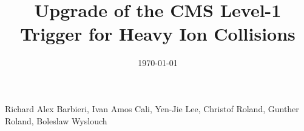 \begin{titlepage}
\vspace{-.2 cm} 
\date{\today}
\vspace{2 cm}
\title{Upgrade of the CMS Level-1 Trigger for Heavy Ion Collisions}

\vspace{.2 cm} 
\begin{Authlist}
Richard Alex Barbieri\footnotemark[1],
Ivan Amos Cali\footnotemark[1],
Yen-Jie Lee\footnotemark[1], 
Christof Roland\footnotemark[1], 
Gunther Roland\footnotemark[1], 
Boleslaw Wyslouch\footnotemark[1]
\end{Authlist}



\end{titlepage}





